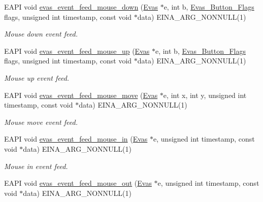 \begin{DoxyCompactItemize}
EAPI void \hyperlink{group__Evas__Event__Feeding__Group_ga5c9811b87406a96ff573b83d1efd52f2}{evas\_\-event\_\-feed\_\-mouse\_\-down} (\hyperlink{group__Evas__Canvas_ga5ff87cc4ce6bc43e3b640a6d37f73043}{Evas} $\ast$e, int b, \hyperlink{Evas_8h_aae3a7dde94160cc18015784fb192bb2f}{Evas\_\-Button\_\-Flags} flags, unsigned int timestamp, const void $\ast$data) EINA\_\-ARG\_\-NONNULL(1)
\begin{DoxyCompactList}\small\item\em Mouse down event feed. \item\end{DoxyCompactList}\item 
EAPI void \hyperlink{group__Evas__Event__Feeding__Group_gacb400569d04ecfd2b89eb0f39856581c}{evas\_\-event\_\-feed\_\-mouse\_\-up} (\hyperlink{group__Evas__Canvas_ga5ff87cc4ce6bc43e3b640a6d37f73043}{Evas} $\ast$e, int b, \hyperlink{Evas_8h_aae3a7dde94160cc18015784fb192bb2f}{Evas\_\-Button\_\-Flags} flags, unsigned int timestamp, const void $\ast$data) EINA\_\-ARG\_\-NONNULL(1)
\begin{DoxyCompactList}\small\item\em Mouse up event feed. \item\end{DoxyCompactList}\item 
EAPI void \hyperlink{group__Evas__Event__Feeding__Group_ga480017cad2b8982bee7a894433aff2f7}{evas\_\-event\_\-feed\_\-mouse\_\-move} (\hyperlink{group__Evas__Canvas_ga5ff87cc4ce6bc43e3b640a6d37f73043}{Evas} $\ast$e, int x, int y, unsigned int timestamp, const void $\ast$data) EINA\_\-ARG\_\-NONNULL(1)
\begin{DoxyCompactList}\small\item\em Mouse move event feed. \item\end{DoxyCompactList}\item 
EAPI void \hyperlink{group__Evas__Event__Feeding__Group_gac9c7fada70cfee1f8124ab5446cc59ed}{evas\_\-event\_\-feed\_\-mouse\_\-in} (\hyperlink{group__Evas__Canvas_ga5ff87cc4ce6bc43e3b640a6d37f73043}{Evas} $\ast$e, unsigned int timestamp, const void $\ast$data) EINA\_\-ARG\_\-NONNULL(1)
\begin{DoxyCompactList}\small\item\em Mouse in event feed. \item\end{DoxyCompactList}\item 
EAPI void \hyperlink{group__Evas__Event__Feeding__Group_ga64f5f2d26a018f4e6154b91251e6bb13}{evas\_\-event\_\-feed\_\-mouse\_\-out} (\hyperlink{group__Evas__Canvas_ga5ff87cc4ce6bc43e3b640a6d37f73043}{Evas} $\ast$e, unsigned int timestamp, const void $\ast$data) EINA\_\-ARG\_\-NONNULL(1)

\end{DoxyCompactItemize}
